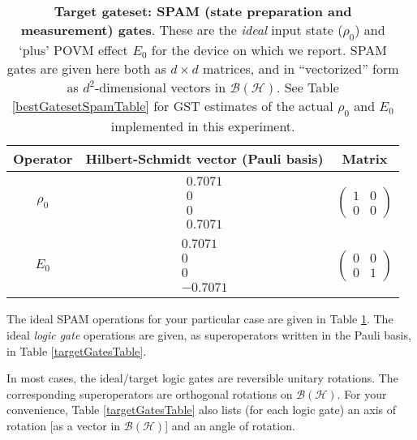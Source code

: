 \documentclass{article}[11pt]
\begin{document}
\begin{table}[h]
\begin{center}
\begin{tabular}[l]{|c|c|c|}
\hline
Operator & Hilbert-Schmidt vector (Pauli basis) & Matrix \\ \hline
$\rho_{0}$ & $ \begin{array}{c}
0.7071 \\ 
0 \\ 
0 \\ 
0.7071
 \end{array} $
 & $ \left(\!\!\begin{array}{cc}
1 & 0 \\ 
0 & 0
 \end{array}\!\!\right) $
 \\ \hline
$E_{0}$ & $ \begin{array}{c}
0.7071 \\ 
0 \\ 
0 \\ 
-0.7071
 \end{array} $
 & $ \left(\!\!\begin{array}{cc}
0 & 0 \\ 
0 & 1
 \end{array}\!\!\right) $
 \\ \hline
\end{tabular}

\caption{\textbf{Target gateset: SPAM (state preparation and measurement) gates}.  These are the \emph{ideal} input state ($\rho_0$) and `plus' POVM effect $E_0$ for the device on which we report.  SPAM gates are given here both as $d\times d$ matrices, and in ``vectorized'' form as $d^2$-dimensional vectors in $\mathcal{B}(\mathcal{H})$.  See Table \ref{bestGatesetSpamTable} for GST estimates of the actual $\rho_0$ and $E_0$ implemented in this experiment.\label{targetSpamTable}}
\end{center}
\end{table}

The ideal SPAM operations for your particular case are given in Table \ref{targetSpamTable}.  The ideal \emph{logic gate} operations are given, as superoperators written in the Pauli basis, in Table \ref{targetGatesTable}.

In most cases, the ideal/target logic gates are reversible unitary rotations.  The corresponding superoperators are orthogonal rotations on $\mathcal{B}(\mathcal{H})$.  For your convenience, Table \ref{targetGatesTable} also lists (for each logic gate) an axis of rotation [as a vector in $\mathcal{B}(\mathcal{H})$] and an angle of rotation.  
\end{document}
